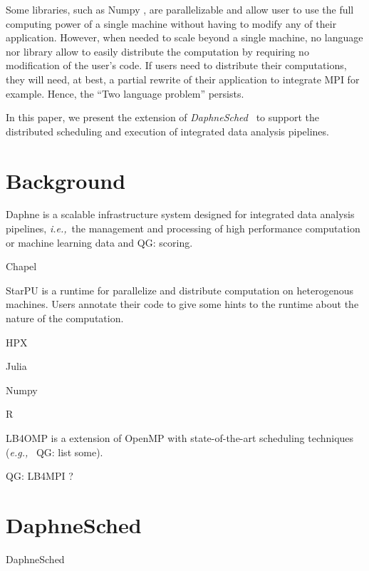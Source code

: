 \documentclass[conference,10pt,a4paper]{IEEEtran}
\newcommand{\ie}{\emph{i.e.,}}
\newcommand{\eg}{\emph{e.g.,}}
\newcommand{\ds}{\emph{DaphneSched}}
\newcommand{\qg}[1]{{\color{blue} QG: #1}} %
\begin{document}
Some libraries, such as Numpy \cite{harris2020array}, are parallelizable and allow user to use the full computing power of a single machine without having to modify any of their application.
However, when needed to scale beyond a single machine, no language nor library allow to easily distribute the computation by requiring no modification of the user's code.
If users need to distribute their computations, they will need, at best, a partial rewrite of their application to integrate MPI for example.
Hence, the ``Two language problem'' persists.

In this paper, we present the extension of \ds\ \cite{eleliemy2023daphnesched} to support the distributed scheduling and execution of integrated data analysis pipelines.



\section{Background}

Daphne \cite{damme2022daphne} is a scalable infrastructure system designed for integrated data analysis pipelines, \ie\ the management and processing of high performance computation or machine learning data and \qg{scoring}.

Chapel \cite{callahan2004cascade}

StarPU \cite{augonnet2009starpu} is a runtime for parallelize and distribute computation on heterogenous machines.
Users annotate their code to give some hints to the runtime about the nature of the computation.

HPX \cite{kaiser2014hpx}

Julia \cite{bezanson2012julia}

Numpy \cite{harris2020array}

R \cite{morandat2012evaluating}

LB4OMP \cite{korndorfer2021lb4omp} is a extension of OpenMP with state-of-the-art scheduling techniques (\eg\ \qg{list some}).

\qg{LB4MPI ?}


\section{DaphneSched}

DaphneSched \cite{eleliemy2023daphnesched}
\end{document}
